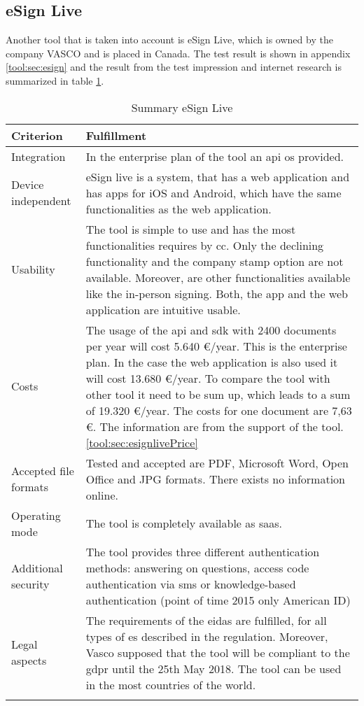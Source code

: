 \subsection{eSign Live}
Another tool that is taken into account is eSign Live, which is owned by the company VASCO and is placed in Canada. The test result is shown in appendix \ref{tool:sec:esign} and the result from the test impression and internet research is summarized in table \ref{tool:tab:esign}.
	\begin{longtable}{|p{4cm}|p{10cm}|} \hline
		\rowcolor{Gray}Criterion & Fulfillment \\ \hline
		Integration & In the enterprise plan of the tool an \gls{api} os provided. \parencite{esign2018info} \\ \hline
		Device independent & eSign live is a system, that has a web application and has \glspl{app} for iOS and Android, which have the same functionalities as the web application. \parencite{esign2018info} \\ \hline
		Usability & The tool is simple to use and has the most functionalities requires by \gls{cc}. Only the declining functionality and the company stamp option are not available. Moreover, are other functionalities available like the in-person signing. Both, the \gls{app} and the web application are intuitive usable.  \\ \hline
		Costs & The usage of the \gls{api} and \gls{sdk} with 2400 documents per year will cost 5.640 \euro/year. This is the enterprise plan. In the case the web application is also used it will cost 13.680 \euro/year. To compare the tool with other tool it need to be sum up, which leads to a sum of 19.320 \euro/year. The costs for one document are 7,63 \euro. The information are from the support of the tool. \ref{tool:sec:esignlivePrice} \\ \hline
		Accepted file formats & Tested and accepted are \gls{PDF}, Microsoft Word, Open Office and JPG formats. There exists no information online.\\ \hline
		Operating mode & The tool is completely available as \gls{saas}.\\ \hline
		Additional security & The tool provides three different authentication methods: answering on questions, access code authentication via \gls{sms} or knowledge-based authentication (point of time 2015 only American ID) \parencite{esign2018security} \\ \hline
		Legal aspects & The requirements of the \gls{eidas} are fulfilled, for all types of \gls{es} described in the regulation. Moreover, Vasco supposed that the tool will be compliant to the \gls{gdpr} until the 25th May 2018. The tool can be used in the most countries of the world. \parencite{esign2018eidas,esign2018legal} \\ \hline
	\caption{Summary eSign Live}
	\label{tool:tab:esign}
	\end{longtable}

